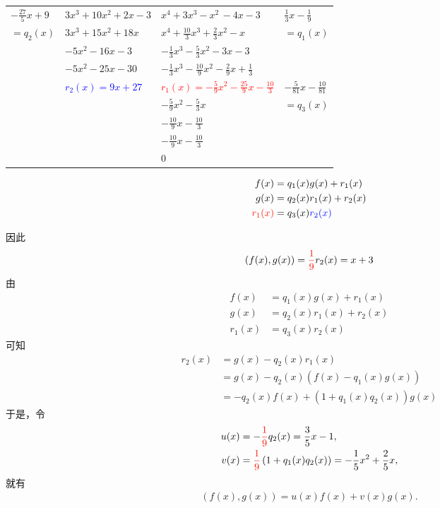\documentclass[13pt,fontset=mac]{ctexbeamer}
\newcommand{\blue}{\textcolor{blue}}
\newcommand{\red}{\textcolor{red}}
\begin{document}
\begin{frame}
	\begin{center}
				\renewcommand\arraystretch{1.2}
		\begin{tabular}{R{1.5cm}|R{3cm} |R{4cm}|L{1.7cm}}
			$-\frac{27}{5}x+9$ &{$3x^3+10x^2+2x-3$}&{$x^4+3x^3-x^2\, -4x-3$}&$\frac{1}{3}x-\frac{1}{9}$\\
			$=q_2(x)$ & $3x^3+15x^2+18x\quad $ & $x^4+\frac{10}{3}x^3+\frac{2}{3}x^2-x\qquad $& $=q_1(x)$\\
			&$ -5x^2-16x-3$ & $-\frac{1}{3}x^3-\frac{5}{3}x^2-3x-3\, $ & \\
			&$ -5x^2-25x-30$ & $-\frac{1}{3}x^3-\frac{10}{9}x^2-\frac{2}{9}x+\frac{1}{3}$ & \\
			&\blue{$r_2(x) = 9x+27$} & \red{$r_1(x) =-\frac{5}{9}x^2-\frac{25}{9}x-\frac{10}{3}$} & $-\frac{5}{81}x-\frac{10}{81}$\\
			& & $-\frac{5}{9}x^2-\frac{5}{3}x$ & $=q_3(x)$\\
			& & $-\frac{10}{9}x-\frac{10}{3}$ & \\
			& & $-\frac{10}{9}x-\frac{10}{3}$ & \\
			& & 0 & \\
		\end{tabular}
	\end{center}

	\begin{align*}
		{f(x)} & =q_1(x) {g(x)} +r_1(x)\\
		{g(x)} & =q_2(x) {r_1(x)} +r_2(x)\\
		\red{r_1(x)} & = q_3(x) \blue{r_2(x)}
	\end{align*}



\end{frame}

\begin{frame}
因此
    $$(f(x), g(x))=\red{\frac{1}{9}}r_2(x)= x+3$$
由\begin{align*}
        {f(x)} & =q_1(x) {g(x)} +r_1(x)\\
        {g(x)} & =q_2(x) {r_1(x)} +r_2(x)\\
        {r_1(x)} & = q_3(x) {r_2(x)}
    \end{align*}
可知
\begin{align*}
r_2(x)  & ={g(x)} - q_2(x) {r_1(x)} \\
 & ={g(x)} - q_2(x) \left(   {f(x)} - q_1(x) {g(x)}  \right)  \\
 & = - q_2(x) {f(x)} + \left(  1+  q_1(x)  q_2(x)   \right)  {g(x)}
\end{align*}
于是，令
\begin{align*}
u(x) & =  - \red{\frac{1}{9}} q_2(x) = \frac{3}{5} x-1,\\
v(x) & =\red{\frac{1}{9}} \left(  1+  q_1(x)  q_2(x)   \right) =  -\frac{1}{5} x^{2}+\frac{2}{5} x,
\end{align*}
就有
\begin{align*}
(f(x), g(x))=u(x) f(x)+v(x) g(x) .
\end{align*}


\end{frame}
\end{document}
